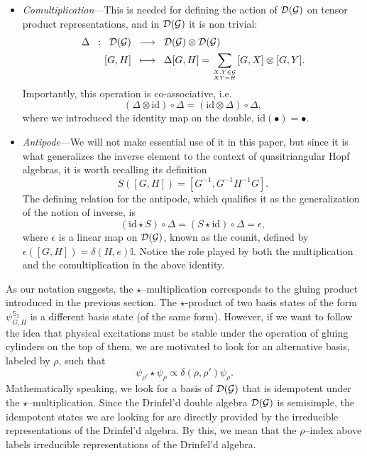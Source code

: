 \documentclass[nofootinbib,superscriptaddress,eqsecnum,tightenlines,11pt]{revtex4-1}
\def\nn{\nonumber}
\def\mG{\mathcal{G}}
\def\be{\begin{equation}}
\def\ee{\end{equation}}
\renewcommand{\S}{{\mathbb S}}
\begin{document}
\begin{itemize}
%
\item[{\it ii})] {\it Comultiplication}---This is needed for defining the action of ${\cal D}(\mG)$ on tensor product representations, and in ${\cal D}(\mG)$ it is non trivial:
\begin{align}
	\Delta \;\;  : \;\; \mathcal{D}(\mathcal{G}) \;\; &\longrightarrow \;\;\mathcal{D}(\mathcal{G}) \otimes \mathcal{D}(\mathcal{G}) \\ \nn
	[G,H]\;\; &\longmapsto \;\;\Delta[G,H] = 
	\sum_{X,Y \in \mG \atop XY =H}[G,X]\otimes [G,Y].
\end{align}
Importantly, this operation is co-associative, i.e.
\be
	(\Delta \otimes \text{id})\circ \Delta  = (\text{id} \otimes \Delta)\circ \Delta,
\ee
where we introduced the identity map on the double, $\text{id}({\scriptstyle \bullet}) = {\scriptstyle \bullet}$. 
\item[{\it ii})] {\it Antipode}---We will not make essential use of it in this paper, but since it is what generalizes the inverse element to the context of quasitriangular Hopf algebras, it is worth recalling its definition
\be\label{eq_antipode}
	S([G,H]) = [G^{-1},G^{-1}H^{-1}G].
\ee
The defining relation for the antipode, which qualifies it as the generalization of the notion of inverse, is
\be
	(\text{id}\star S)\circ\Delta = (S \star \text{id})\circ \Delta = \epsilon ,
\ee
where $\epsilon$ is a linear map on ${\cal D}(\mG)$, known as the counit, defined by $\epsilon([G,H]) = \delta(H,e)\mathbb I $.
Notice the role played by both the multiplication and the comultiplication in the above identity.
\end{itemize}


As our notation suggests,  the $\star$--multiplication corresponds to the gluing product introduced in the previous section. 
The $\star$-product of two basis states of the form $\psi^{\S_2}_{G,H}$ is a different basis state (of the same form).
However, if we want to follow the idea that physical excitations must be stable under the operation of gluing cylinders on the top of them, we are motivated to look for an alternative basis, labeled by $\rho$, such that
\be
	\psi_{\rho'}\star \psi_{\rho} \propto \delta(\rho,\rho')\psi_{\rho}.
	\label{idempo}
\ee
Mathematically speaking, we look for a basis of ${\cal D}(\mG)$ that is idempotent under the  $\star$--multiplication.
Since the Drinfel'd double algebra ${\cal D}(\mG)$ is semisimple, the idempotent states we are looking for are directly provided by the irreducible representations of the Drinfel'd algebra.
By this, we mean that the $\rho$--index above labels irreducible representations of the Drinfel'd algebra.
\end{document}

